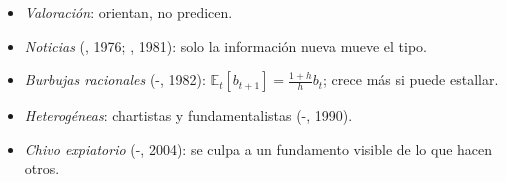 \documentclass{article}
\begin{document}
\begin{columnas}
\begin{itemize}
\item \emph{Valoración}: orientan, no predicen.
\end{itemize}
\begin{itemize}
\item \emph{Noticias} (, 1976; , 1981): solo la información nueva mueve el tipo.
\item \emph{Burbujas racionales} (-, 1982): $\mathbb{E}_t[b_{t+1}]=\frac{1+h}{h}b_t$; crece más si puede estallar.
\item \emph{Heterogéneas}: chartistas y fundamentalistas (-, 1990).
\item \emph{Chivo expiatorio} (-, 2004): se culpa a un fundamento visible de lo que hacen otros.
\end{itemize}


\end{columnas}
\end{document}
